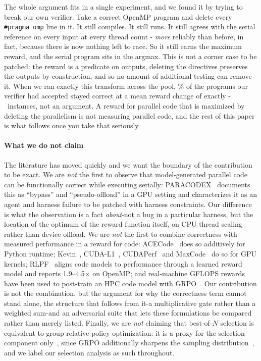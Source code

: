 The whole argument fits in a single experiment, and we found it by trying to break our own verifier. Take a correct OpenMP program and delete every \texttt{\#pragma omp} line in it. It still compiles. It still runs. It still agrees with the serial reference on every input at every thread count - \emph{more} reliably than before, in fact, because there is now nothing left to race. So it still earns the maximum reward, and the serial program sits in the argmax. This is not a corner case to be patched: the reward is a predicate on outputs, deleting the directives preserves the outputs by construction, and so no amount of additional testing can remove it. When we ran exactly this transform across the pool, \SPRate\% of the programs our verifier had accepted stayed correct at a mean reward change of exactly \SPRewardDeltaCorr - \NAccepted\ instances, not an argument. A reward for parallel code that is maximized by deleting the parallelism is not measuring parallel code, and the rest of this paper is what follows once you take that seriously.

\paragraph*{What we do not claim}
The literature has moved quickly and we want the boundary of the contribution to be exact. We are \emph{not} the first to observe that model-generated parallel code can be functionally correct while executing serially: PARACODEX~\cite{paracodex} documents this as ``bypass'' and ``pseudo-offload'' in a GPU setting and characterizes it as an agent and harness failure to be patched with harness constraints. Our difference is what the observation is a fact \emph{about}-not a bug in a particular harness, but the location of the optimum of the reward function itself, on CPU thread scaling rather than device offload. We are \emph{not} the first to combine correctness with measured performance in a reward for code: ACECode~\cite{acecode} does so additively for Python runtime; Kevin~\cite{kevin}, CUDA-L1~\cite{cudal1}, CUDAPerf~\cite{cudaperf} and MaxCode~\cite{maxcode} do so for GPU kernels; RLPF~\cite{rlpf} aligns code models to performance through a learned reward model and reports 1.9--4.5$\times$ on OpenMP; and real-machine GFLOPS rewards have been used to post-train an HPC code model with GRPO~\cite{realmachine}. Our contribution is not the combination, but the argument for why the correctness term cannot stand alone, the structure that follows from it-a multiplicative gate rather than a weighted sum-and an adversarial suite that lets these formulations be compared rather than merely listed. Finally, we are \emph{not} claiming that best-of-$N$ selection is equivalent to group-relative policy optimization: it is a proxy for the selection component only~\cite{bonmaxk}, since GRPO additionally sharpens the sampling distribution~\cite{rewardunlikely}, and we label our selection analysis as such throughout.

